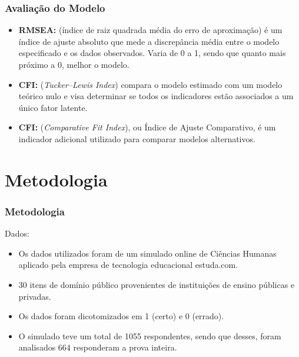 \documentclass{beamer}
\begin{document}
\begin{frame}
	
	\frametitle{Avaliação do Modelo}

	\begin{itemize}
		\item \textbf{RMSEA:} (índice de raiz quadrada média do erro de aproximação) é um índice de ajuste absoluto que mede a discrepância média entre o modelo especificado e os dados observados. Varia de 0 a 1, sendo que quanto mais próximo a 0, melhor o modelo.
		
		\item \textbf{CFI:} (\textit{Tucker–Lewis Index})  compara o modelo estimado com um modelo teórico nulo e visa determinar se todos os indicadores estão associados a um único fator latente. 
		
		\item \textbf{CFI:} (\textit{Comparative Fit Index}), ou Índice de Ajuste Comparativo, é um indicador adicional utilizado para comparar modelos alternativos.
		
		
	\end{itemize}
	
\end{frame}	




	\section{Metodologia}
	
	\begin{frame}
		
		\frametitle{Metodologia}
		
		\begin{center}	Dados:	\end{center}
		
		\begin{itemize}
			\item Os dados utilizados foram de um simulado online de Ciências Humanas aplicado pela empresa de tecnologia educacional estuda.com. \pause
			\item 30 itens de domínio público provenientes de instituições de ensino públicas e privadas. \pause
			\item Os dados foram dicotomizados em 1 (certo) e 0 (errado). \pause
			\item O simulado teve um total de 1055 respondentes, sendo que desses, foram analisados 664	responderam a prova inteira. \pause
		\end{itemize}
		
		

	\end{frame}
	
\end{document}
